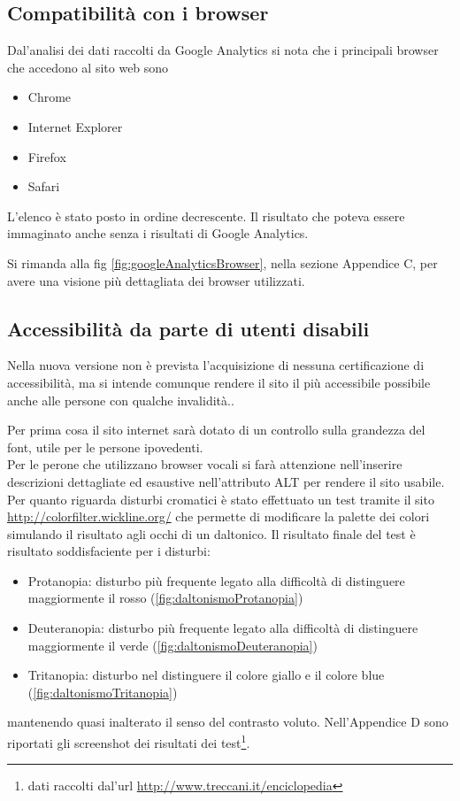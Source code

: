 \documentclass[a4paper,12pt,hidelinks]{report}
\begin{document}
  \subsection{Compatibilità con i browser}
    Dal'analisi dei dati raccolti da Google Analytics si nota che i principali browser che accedono al sito web sono
    \begin{itemize}
    \item Chrome
    \item Internet Explorer
    \item Firefox
    \item Safari
    \end{itemize}
    L'elenco è stato posto in ordine decrescente. Il risultato che poteva essere immaginato anche senza i risultati di Google Analytics.
    \par Si rimanda alla fig \ref{fig:googleAnalyticsBrowser}, nella sezione Appendice C, per avere una visione più dettagliata dei browser utilizzati.
  
  \subsection{Accessibilità da parte di utenti disabili}
    Nella nuova versione non è prevista l'acquisizione di nessuna certificazione di accessibilità, ma si intende comunque rendere il sito il più accessibile possibile anche alle
    persone con qualche invalidità..
    \par Per prima cosa il sito internet sarà dotato di un controllo sulla grandezza del font, utile per le persone ipovedenti. 
    \\ Per le perone che utilizzano browser vocali si farà attenzione nell'inserire descrizioni dettagliate ed esaustive nell'attributo ALT per rendere il sito usabile.
    \\ Per quanto riguarda disturbi cromatici è stato effettuato un test tramite il sito \url{http://colorfilter.wickline.org/} che permette di modificare la palette dei colori
    simulando il risultato agli occhi di un daltonico. Il risultato finale del test è risultato soddisfaciente per i disturbi:
    \begin{itemize}
      \item Protanopia: disturbo più frequente legato alla difficoltà di distinguere maggiormente il rosso (\ref{fig:daltonismoProtanopia})
      \item Deuteranopia: disturbo più frequente legato alla difficoltà di distinguere maggiormente il verde (\ref{fig:daltonismoDeuteranopia})
      \item Tritanopia: disturbo nel distinguere il colore giallo e il colore blue (\ref{fig:daltonismoTritanopia})
    \end{itemize}
    mantenendo quasi inalterato il senso del contrasto voluto. Nell'Appendice D sono riportati gli screenshot dei risultati dei test\footnote{dati raccolti dal'url \url{http://www.treccani.it/enciclopedia}}.
\end{document}
